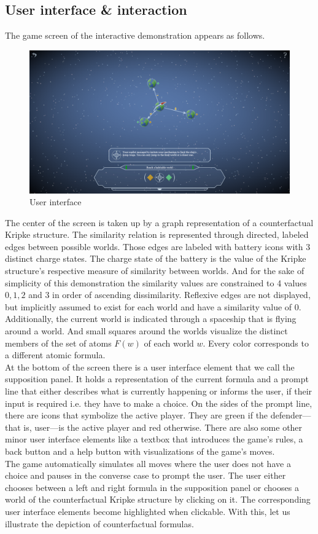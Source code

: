 \documentclass[a4paper,american,10pt]{paper}
\theoremstyle{definition}\newtheorem{definition}{Definition}
\begin{document}
\subsection{User interface \& interaction}
The game screen of the interactive demonstration appears as follows.
\begin{figure}[H]
\centering
\includegraphics[width=\textwidth]{UI_Layout}
\caption{User interface}
\end{figure}
The center of the screen is taken up by a graph representation of a counterfactual Kripke structure. The similarity relation is represented through directed, labeled edges between possible worlds. Those edges are labeled with battery icons with 3 distinct charge states. The charge state of the battery is the value of the Kripke structure's respective measure of similarity between worlds. And for the sake of simplicity of this demonstration the similarity values are constrained to 4 values $0,1,2$ and $3$ in order of ascending dissimilarity. Reflexive edges are not displayed, but implicitly assumed to exist for each world and have a similarity value of 0. Additionally, the current world is indicated through a spaceship that is flying around a world. And small squares around the worlds visualize the distinct members of the set of atoms $F(w)$ of each world $w$. Every color corresponds to a different atomic formula.\\
\indent At the bottom of the screen there is a user interface element that we call the supposition panel. It holds a representation of the current formula and a prompt line that either describes what is currently happening or informs the user, if their input is required i.e. they have to make a choice. On the sides of the prompt line, there are icons that symbolize the active player. They are green if the defender---that is, user---is the active player and red otherwise.
There are also some other minor user interface elements like a textbox that introduces the game's rules, a back button and a help button with visualizations of the game's moves.\\
\indent The game automatically simulates all moves where the user does not have a choice and pauses in the converse case to prompt the user. The user either chooses between a left and right formula in the supposition panel or chooses a world of the counterfactual Kripke structure by clicking on it. The corresponding user interface elements become highlighted when clickable. With this, let us illustrate the depiction of counterfactual formulas.
\end{document}
